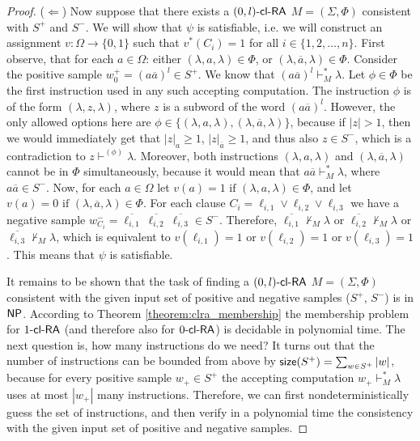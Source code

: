 \begin{proof}
($\Leftarrow$)
Now suppose that there exists a $\zlclRA$ $M = (\Sigma, \Phi)$ consistent with $S^+$ and $S^-$. We will show that $\psi$ is satisfiable, i.e. we will construct an assignment $v: \Omega \to \{0, 1\}$ such that $v^*(C_i) = 1$ for all $i \in \{1, 2, \ldots, n\}$. First observe, that for each $a \in \Omega$: either $(\lambda, a, \lambda) \in \Phi$, or $(\lambda, \overline{a}, \lambda) \in \Phi$. Consider the positive sample $w_0^+ = (a \overline{a})^l \in S^+$. We know that $(a \overline{a})^l \vdash_M^* \lambda$. Let $\phi \in \Phi$ be the first instruction used in any such accepting computation. The instruction $\phi$ is of the form $(\lambda, z, \lambda)$, where $z$ is a subword of the word $(a \overline{a})^l$. However, the only allowed options here are $\phi \in \{ (\lambda, a, \lambda), (\lambda, \overline{a}, \lambda) \}$, because if $|z| > 1$, then we would immediately get that $|z|_a \ge 1$, $|z|_{\overline{a}} \ge 1$, and thus also $z \in S^-$, which is a contradiction to $z \vdash^{(\phi)} \lambda$. Moreover, both instructions $(\lambda, a, \lambda)$ and $(\lambda, \overline{a}, \lambda)$ cannot be in $\Phi$ simultaneously, because it would mean that $a \overline{a} \vdash_M^* \lambda$, where $a \overline{a} \in S^-$. Now, for each $a \in \Omega$ let $v(a) = 1 \text{ if } (\lambda, a, \lambda) \in \Phi$, and let $v(a) = 0 \text{ if } (\lambda, \overline{a}, \lambda) \in \Phi$. For each clause $C_i = \ell_{i,1} \vee \ell_{i,2} \vee \ell_{i,3}$ we have a negative sample $w_{C_i}^- = \overline{\ell_{i,1}}\ \overline{\ell_{i,2}}\ \overline{\ell_{i,3}} \in S^-$. Therefore, $\overline{\ell_{i,1}} \not\vdash_M \lambda$ or $\overline{\ell_{i,2}} \not\vdash_M \lambda$ or $\overline{\ell_{i,3}} \not\vdash_M \lambda$, which is equivalent to $v(\ell_{i,1}) = 1$ or $v(\ell_{i,2}) = 1$ or $v(\ell_{i,3}) = 1$. This means that $\psi$ is satisfiable.

It remains to be shown that the task of finding a $\zlclRA$ $M = (\Sigma, \Phi)$ consistent with the given input set of positive and negative samples ($S^+$, $S^-$) is in $\NP$. According to Theorem \ref{theorem:clra_membership} the membership problem for $\kclRA[1]$ (and therefore also for $\kclRA[0]$) is decidable in polynomial time. The next question is, how many instructions do we need? It turns out that the number of instructions can be bounded from above by $\size(S^+) = \sum_{w \in S^+} |w|$, because for every positive sample $w_+ \in S^+$ the accepting computation $w_+ \vdash_M^* \lambda$ uses at most $|w_+|$ many instructions. Therefore, we can first nondeterministically guess the set of instructions, and then verify in a polynomial time the consistency with the given input set of positive and negative samples.
\end{proof}

